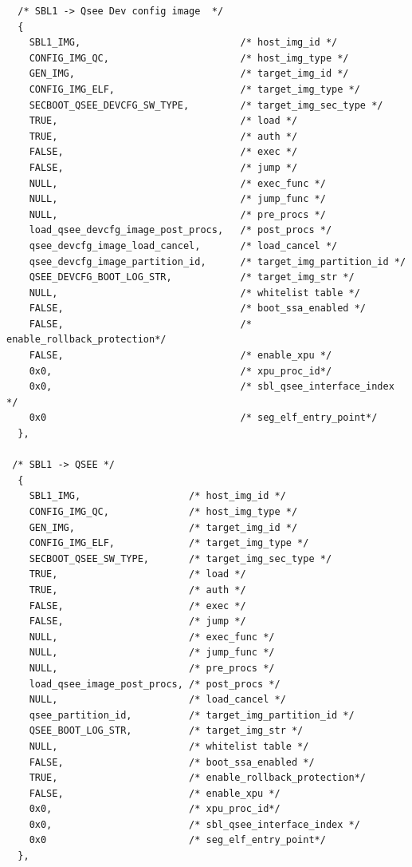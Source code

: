 \begin{lstlisting}
  /* SBL1 -> Qsee Dev config image  */
  {
    SBL1_IMG,                            /* host_img_id */
    CONFIG_IMG_QC,                       /* host_img_type */
    GEN_IMG,                             /* target_img_id */
    CONFIG_IMG_ELF,                      /* target_img_type */
    SECBOOT_QSEE_DEVCFG_SW_TYPE,         /* target_img_sec_type */ 
    TRUE,                                /* load */
    TRUE,                                /* auth */
    FALSE,                               /* exec */
    FALSE,                               /* jump */
    NULL,                                /* exec_func */
    NULL,                                /* jump_func */
    NULL,                                /* pre_procs */ 
    load_qsee_devcfg_image_post_procs,   /* post_procs */
    qsee_devcfg_image_load_cancel,       /* load_cancel */
    qsee_devcfg_image_partition_id,      /* target_img_partition_id */
    QSEE_DEVCFG_BOOT_LOG_STR,            /* target_img_str */
    NULL,                                /* whitelist table */
    FALSE,                               /* boot_ssa_enabled */
    FALSE,                               /* enable_rollback_protection*/
    FALSE,                               /* enable_xpu */
    0x0,                                 /* xpu_proc_id*/    
    0x0,                                 /* sbl_qsee_interface_index */
    0x0                                  /* seg_elf_entry_point*/
  },  
  
 /* SBL1 -> QSEE */
  {
    SBL1_IMG,                   /* host_img_id */
    CONFIG_IMG_QC,              /* host_img_type */
    GEN_IMG,                    /* target_img_id */
    CONFIG_IMG_ELF,             /* target_img_type */
    SECBOOT_QSEE_SW_TYPE,       /* target_img_sec_type */ 
    TRUE,                       /* load */
    TRUE,                       /* auth */
    FALSE,                      /* exec */
    FALSE,                      /* jump */
    NULL,                       /* exec_func */
    NULL,                       /* jump_func */
    NULL,                       /* pre_procs */ 
    load_qsee_image_post_procs, /* post_procs */
    NULL,                       /* load_cancel */
    qsee_partition_id,          /* target_img_partition_id */
    QSEE_BOOT_LOG_STR,          /* target_img_str */
    NULL,                       /* whitelist table */
    FALSE,                      /* boot_ssa_enabled */
    TRUE,                       /* enable_rollback_protection*/
    FALSE,                      /* enable_xpu */
    0x0,                        /* xpu_proc_id*/    
    0x0,                        /* sbl_qsee_interface_index */
    0x0                         /* seg_elf_entry_point*/
  },



\end{lstlisting}

